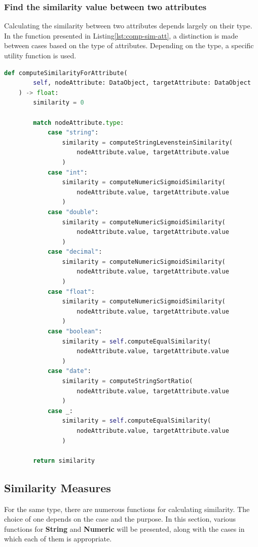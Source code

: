 \subsubsection{Find the similarity value between two attributes} 
Calculating the similarity between two attributes depends largely on their type. In the function presented in Listing\ref{lst:comp-sim-att}, a distinction is made between cases based on the type of attributes. Depending on the type, a specific utility function is used.\\

\begin{lstlisting}[language=Python, caption=Function to compute the similarity value between two attributes, label={lst:comp-sim-att}]
def computeSimilarityForAttribute(
        self, nodeAttribute: DataObject, targetAttribute: DataObject
    ) -> float:
        similarity = 0

        match nodeAttribute.type:
            case "string":
                similarity = computeStringLevensteinSimilarity(
                    nodeAttribute.value, targetAttribute.value
                )
            case "int":
                similarity = computeNumericSigmoidSimilarity(
                    nodeAttribute.value, targetAttribute.value
                )
            case "double":
                similarity = computeNumericSigmoidSimilarity(
                    nodeAttribute.value, targetAttribute.value
                )
            case "decimal":
                similarity = computeNumericSigmoidSimilarity(
                    nodeAttribute.value, targetAttribute.value
                )
            case "float":
                similarity = computeNumericSigmoidSimilarity(
                    nodeAttribute.value, targetAttribute.value
                )
            case "boolean":
                similarity = self.computeEqualSimilarity(
                    nodeAttribute.value, targetAttribute.value
                )
            case "date":
                similarity = computeStringSortRatio(
                    nodeAttribute.value, targetAttribute.value
                )
            case _:
                similarity = self.computeEqualSimilarity(
                    nodeAttribute.value, targetAttribute.value
                )

        return similarity
\end{lstlisting}
    

\subsection{Similarity Measures}
For the same type, there are numerous functions for calculating similarity. The choice of one depends on the case and the purpose. In this section, various functions for \textbf{String} and \textbf{Numeric} will be presented, along with the cases in which each of them is appropriate.
    
